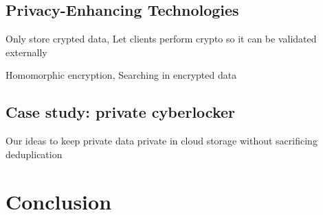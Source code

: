 \documentclass[11pt]{article}
\begin{document}
\subsection{Privacy-Enhancing Technologies}
Only store crypted data, Let clients perform crypto so it can be validated externally
\cite{itani2009privacy, chow2009controlling}

Homomorphic encryption,
Searching in encrypted data \cite{harrower2009searching, li2010fuzzy, kamara2010cryptographic}

\subsection{Case study: private cyberlocker}
Our ideas to keep private data private in cloud storage without sacrificing deduplication

\section{Conclusion}


{}

\end{document}
